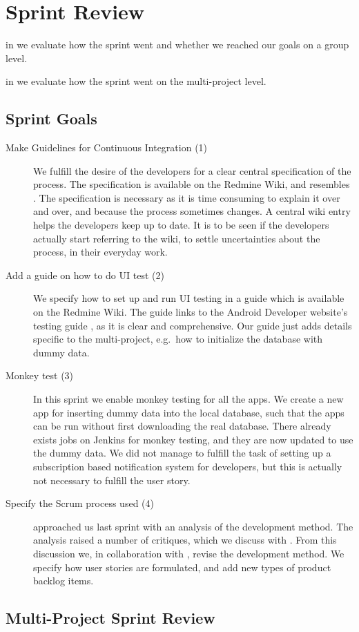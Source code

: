 \chapter{Sprint Review}\label{chap:sprint3_end}

\begin{chapterorganization}
  \item in  we evaluate how the sprint went and whether we reached our goals on a group level.
  \item in  we evaluate how the sprint went on the multi-project level.
\end{chapterorganization}

\section{Sprint Goals}\label{sec:s3_goals}
\begin{description}
  \item[Make Guidelines for Continuous Integration (1)] We fulfill the desire of the developers for a clear central specification of the process. The specification is available on the Redmine Wiki, and resembles . The specification is necessary as it is time consuming to explain it over and over, and because the process sometimes changes. A central wiki entry helps the developers keep up to date. It is to be seen if the developers actually start referring to the wiki, to settle uncertainties about the process, in their everyday work. 
  \item[Add a guide on how to do UI test (2)] We specify how to set up and run UI testing in a guide which is available on the Redmine Wiki. The guide links to the Android Developer website's testing guide \parencite{AndroidUnit}, as it is clear and comprehensive. Our guide just adds details specific to the multi-project, e.g.\ how to initialize the database with dummy data.  
  \item[Monkey test (3)] In this sprint we enable monkey testing for all the apps. We create a new app for inserting dummy data into the local database, such that the apps can be run without first downloading the real database. There already exists jobs on Jenkins for monkey testing, and they are now updated to use the dummy data. We did not manage to fulfill the task of setting up a subscription based notification system for developers, but this is actually not necessary to fulfill the user story.
  \item[Specify the Scrum process used (4)]  approached us last sprint with an analysis of the development method. The analysis raised a number of critiques, which we discuss with . From this discussion we, in collaboration with , revise the development method. We specify how user stories are formulated, and add new types of product backlog items.
\end{description}

\section{Multi-Project Sprint Review}\label{sec:s3_multiprj_review}
\dummy